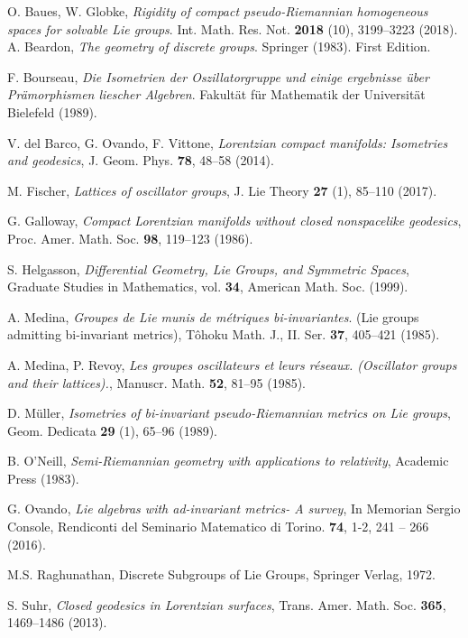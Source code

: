 \documentclass[12pt]{amsart}
\theoremstyle{plain}
\theoremstyle{definition}
\theoremstyle{remark}
\begin{document}
\begin{thebibliography}{GGGG}
		
	 {\sc O. Baues, W. Globke}, {\it Rigidity of compact pseudo-Riemannian homogeneous spaces for solvable Lie groups}. 
		Int. Math. Res. Not. {\bf  2018} (10), 3199--3223 (2018). 
	 {\sc A. Beardon}, {\it The geometry of discrete groups}. Springer (1983). First Edition. 
	
	 {\sc F. Bourseau}, {\it Die Isometrien der Oszillatorgruppe und einige ergebnisse \"uber Pr\"amorphismen liescher Algebren}. Fakult\"at f\"ur Mathematik der Universit\"at Bielefeld (1989).
	
	 {\sc V. del Barco, \sc G. Ovando, \sc F. Vittone}, {\it Lorentzian compact manifolds: Isometries and geodesics}, J. Geom. Phys. {\bf 78}, 48--58 (2014).
	
	 {\sc M. Fischer}, {\it Lattices of oscillator groups}, J. Lie Theory {\bf 27} (1), 85--110 (2017). 	
		
	 {\sc G.  Galloway}, {\it  Compact Lorentzian manifolds without closed nonspacelike geodesics}, Proc.
		Amer. Math. Soc. {\bf 98}, 119--123  (1986).
		
	 {\sc S. Helgasson}, {\it Differential Geometry, Lie Groups, and Symmetric Spaces}, Graduate Studies in Mathematics, vol. {\bf 34}, American Math. Soc. (1999).
		
	 {\sc A. Medina}, {\it Groupes de Lie munis de m\'etriques bi-invariantes}. (Lie groups admitting bi-invariant metrics), T\^ohoku Math. J., II. Ser. {\bf 37}, 405--421 (1985). 
	
	 {\sc A. Medina,  P. Revoy}, {\it Les groupes oscillateurs et leurs r\'eseaux. (Oscillator groups and their lattices).}, Manuscr. Math. {\bf 52}, 81--95 (1985). 

	 {\sc D. M\"uller}, {\it Isometries of bi-invariant pseudo-Riemannian metrics on Lie groups},  Geom. Dedicata {\bf 29} (1),  65--96 (1989).

	 {\sc B. O'Neill}, {\it Semi-Riemannian geometry with
		applications to relativity}, Academic Press (1983).
	
	 {\sc G. Ovando}, {\it Lie algebras with ad-invariant metrics- A survey}, In Memorian Sergio Console, Rendiconti del Seminario Matematico di Torino. {\bf  74}, 1-2, 241 -- 266 (2016).
	
	 {\sc  M.S. Raghunathan}, Discrete Subgroups of Lie Groups, Springer Verlag, 1972.
	
	 {\sc S. Suhr}, {\it Closed geodesics in Lorentzian surfaces},  	Trans. Amer. Math. Soc. {\bf 365}, 1469--1486 (2013).
	
\end{thebibliography}

\appendix 
\end{document}
